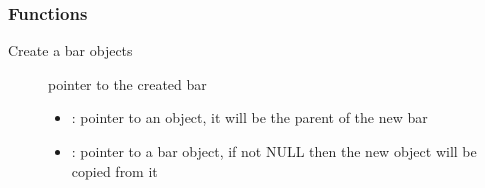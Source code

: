 \documentclass[letterpaper,10pt,english]{sphinxmanual}
\begin{document}
\subsubsection*{Functions}

\begin{fulllineitems}
\label{\detokenize{object-types/bar:_CPPv413lv_bar_createP8lv_obj_tPK8lv_obj_t}}%
\pysigstartmultiline
{}\label{\detokenize{object-types/bar:lv__bar_8h_1ac4863a6fc2c19461806eae7795d0f1fa}}%
\pysigstopmultiline
Create a bar objects \begin{description}
\item[{}] \leavevmode
pointer to the created bar 

\item[{}] \leavevmode\begin{itemize}
\item {} 
: pointer to an object, it will be the parent of the new bar 

\item {} 
: pointer to a bar object, if not NULL then the new object will be copied from it 

\end{itemize}

\end{description}


\end{fulllineitems}

\end{document}
